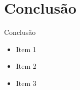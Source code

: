 \AtBeginSection[]{
	\begin{frame}
		\frametitle{}
		\tableofcontents[currentsection]
	\end{frame}
}

\section{Conclusão}
\begin{frame}{Conclusão}
	\begin{itemize}[<+->]
		\item Item 1
		\item Item 2
		\item Item 3
	\end{itemize}
\end{frame}